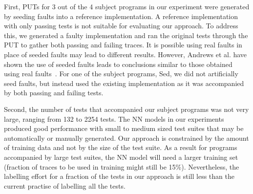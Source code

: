 First, PUTs for 3 out of the 4 subject programs in our experiment were generated by seeding faults into a reference implementation. A reference implementation with only passing tests is not suitable for evaluating our approach.  To address this, we generated a faulty implementation and ran the original tests through the PUT to gather both passing and failing traces.  
It is possible using real faults in place of seeded faults may lead to
different results. However, Andrews et al. have shown the use of seeded faults leads to conclusions
similar to those obtained using real faults~\cite{andrews2006using, Do1707670}. 
For one of the subject programs, Sed,  we did not artificially seed faults, but instead used the existing implementation as it was accompanied by both passing and failing tests. %

Second, the number of tests that accompanied our subject programs was not very large, ranging from 132 to 2254 tests. The NN models in our experiments produced good performance with small to medium sized test suites that may be automatically or manually generated. Our approach is constrained by the amount of training data and not by the size of the test suite. As a result for programs accompanied by large test suites, the NN model will need a larger training set (fraction of traces to be used in training might still be 15\%). Nevertheless, the labelling effort for a fraction of the tests in our approach is still less than the current practise of labelling all the tests. 


